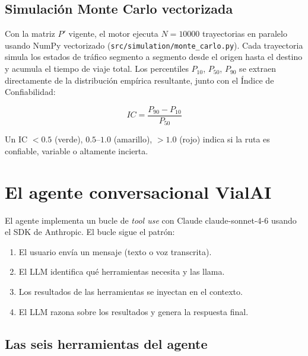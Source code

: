 \documentclass[11pt,a4paper]{article}
\newcommand{\VialAI}{\textbf{\textcolor{vialTeal}{Vial}\textcolor{vialAmber}{AI}}}
\begin{document}
\subsection{Simulación Monte Carlo vectorizada}

Con la matriz $P'$ vigente, el motor ejecuta $N = 10000$ trayectorias
en paralelo usando NumPy vectorizado (\texttt{src/simulation/monte\_carlo.py}).
Cada trayectoria simula los estados de tráfico segmento a segmento
desde el origen hasta el destino y acumula el tiempo de viaje total.
Los percentiles $P_{10}$, $P_{50}$, $P_{90}$ se extraen directamente
de la distribución empírica resultante, junto con el Índice de
Confiabilidad:

\[
IC = \frac{P_{90} - P_{10}}{P_{50}}
\]

Un IC $< 0.5$ (verde), $0.5$--$1.0$ (amarillo), $> 1.0$ (rojo) indica
si la ruta es confiable, variable o altamente incierta.

\section{El agente conversacional \VialAI}

El agente implementa un bucle de \emph{tool use} con Claude claude-sonnet-4-6
usando el SDK de Anthropic. El bucle sigue el patrón:

\begin{enumerate}
\item El usuario envía un mensaje (texto o voz transcrita).
\item El LLM identifica qué herramientas necesita y las llama.
\item Los resultados de las herramientas se inyectan en el contexto.
\item El LLM razona sobre los resultados y genera la respuesta final.
\end{enumerate}

\subsection{Las seis herramientas del agente}
\end{document}
